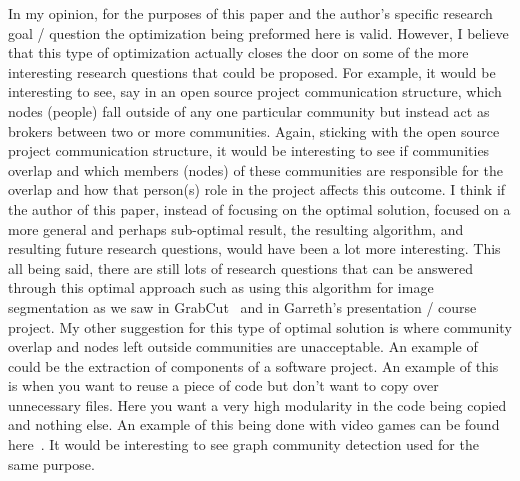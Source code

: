 \documentclass[conference]{IEEEtran}
\begin{document}
In my opinion, for the purposes of this paper and the author's specific research goal / question the optimization being preformed
here is valid. However, I believe that this type of optimization actually closes the door on some of the more interesting research
questions that could be proposed. For example, it would be interesting to see, say in an open source project communication structure,
which nodes (people) fall outside of any one particular community but instead act as brokers between two or more communities. Again,
sticking with the open source project communication structure, it would be interesting to see if communities overlap and which members
(nodes) of these communities are responsible for the overlap and how that person(s) role in the project affects this outcome. I think
if the author of this paper, instead of focusing on the optimal solution, focused on a more general and perhaps sub-optimal result,
the resulting algorithm, and resulting future research questions, would have been a lot more interesting. This all being said,
there are still lots of research questions that can be answered through this optimal approach such as using this algorithm for image
segmentation as we saw in GrabCut~\cite{Rother:2004:GIF:1015706.1015720} and in Garreth's presentation / course project. My other
suggestion for this type of optimal solution is where community overlap and nodes left outside communities are unacceptable. An
example of could be the extraction of components of a software project. An example of this is when you want to reuse a piece of
code but don't want to copy over unnecessary files. Here you want a very high modularity in the code being copied and nothing else.
An example of this being done with video games can be found here~\cite{Ampatzoglou:2012:MER:2393132.2393152}. It would be interesting
to see graph community detection used for the same purpose.


\balance



\end{document}
